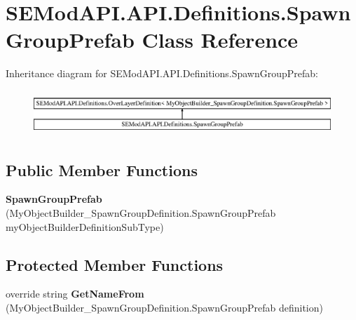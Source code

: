 \hypertarget{class_s_e_mod_a_p_i_1_1_a_p_i_1_1_definitions_1_1_spawn_group_prefab}{}\section{S\+E\+Mod\+A\+P\+I.\+A\+P\+I.\+Definitions.\+Spawn\+Group\+Prefab Class Reference}
\label{class_s_e_mod_a_p_i_1_1_a_p_i_1_1_definitions_1_1_spawn_group_prefab}
Inheritance diagram for S\+E\+Mod\+A\+P\+I.\+A\+P\+I.\+Definitions.\+Spawn\+Group\+Prefab\+:\begin{figure}[H]
\begin{center}
\leavevmode
\includegraphics[height=1.712538cm]{class_s_e_mod_a_p_i_1_1_a_p_i_1_1_definitions_1_1_spawn_group_prefab}
\end{center}
\end{figure}
\subsection*{Public Member Functions}
\begin{DoxyCompactItemize}
\item 
\hypertarget{class_s_e_mod_a_p_i_1_1_a_p_i_1_1_definitions_1_1_spawn_group_prefab_a255d123088f01c97a521cb66b4902086}{}{\bfseries Spawn\+Group\+Prefab} (My\+Object\+Builder\+\_\+\+Spawn\+Group\+Definition.\+Spawn\+Group\+Prefab my\+Object\+Builder\+Definition\+Sub\+Type)\label{class_s_e_mod_a_p_i_1_1_a_p_i_1_1_definitions_1_1_spawn_group_prefab_a255d123088f01c97a521cb66b4902086}

\end{DoxyCompactItemize}
\subsection*{Protected Member Functions}
\begin{DoxyCompactItemize}
\item 
\hypertarget{class_s_e_mod_a_p_i_1_1_a_p_i_1_1_definitions_1_1_spawn_group_prefab_aa13e027789d7353a26e208b9022f0196}{}override string {\bfseries Get\+Name\+From} (My\+Object\+Builder\+\_\+\+Spawn\+Group\+Definition.\+Spawn\+Group\+Prefab definition)\label{class_s_e_mod_a_p_i_1_1_a_p_i_1_1_definitions_1_1_spawn_group_prefab_aa13e027789d7353a26e208b9022f0196}

\end{DoxyCompactItemize}
